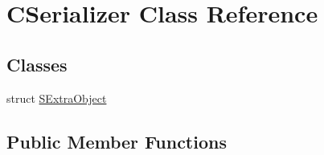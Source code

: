 \hypertarget{class_c_serializer}{}\section{C\+Serializer Class Reference}
\label{class_c_serializer}
\subsection*{Classes}
\begin{DoxyCompactItemize}
\item 
struct \hyperlink{struct_c_serializer_1_1_s_extra_object}{S\+Extra\+Object}
\end{DoxyCompactItemize}
\subsection*{Public Member Functions}
